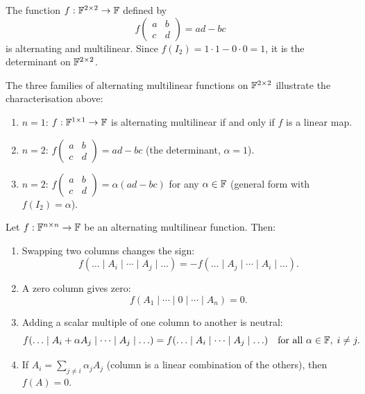 \begin{exbox}
\label{ex:det-2x2}
The function $f:\mathbb{F}^{2\times 2}\to\mathbb{F}$ defined by
\[
    f\!\begin{pmatrix}a&b\\c&d\end{pmatrix} = ad - bc
\]
is alternating and multilinear.  Since $f(I_2)=1\cdot 1-0\cdot 0=1$, it
is the determinant on $\mathbb{F}^{2\times 2}$.

\smallskip\noindent
The three families of alternating multilinear functions on
$\mathbb{F}^{2\times 2}$ illustrate the characterisation above:
\begin{enumerate}
    \item $n=1$: $f:\mathbb{F}^{1\times 1}\to\mathbb{F}$ is alternating multilinear if
          and only if $f$ is a linear map.
    \item $n=2$: $f\begin{pmatrix}a&b\\c&d\end{pmatrix}=ad-bc$
          (the determinant, $\alpha=1$).
    \item $n=2$: $f\begin{pmatrix}a&b\\c&d\end{pmatrix}=\alpha(ad-bc)$
          for any $\alpha\in\mathbb{F}$ (general form with $f(I_2)=\alpha$).
\end{enumerate}
\end{exbox}

\begin{propbox}
\label{prop:alt-mult-props}
Let $f:\mathbb{F}^{n\times n}\to\mathbb{F}$ be an alternating multilinear function.
Then:
\begin{enumerate}[label=\textbf{(\alph*)}]
    \item Swapping two columns changes the sign:
          \[
            f(\ldots\mid A_i\mid\cdots\mid A_j\mid\ldots)
            = -f(\ldots\mid A_j\mid\cdots\mid A_i\mid\ldots).
          \]
    \item A zero column gives zero:
          \[
            f(A_1\mid\cdots\mid 0\mid\cdots\mid A_n)=0.
          \]
    \item Adding a scalar multiple of one column to another is neutral:
          \[
            f(\ldots\mid A_i+\alpha A_j\mid\cdots\mid A_j\mid\ldots)
            = f(\ldots\mid A_i\mid\cdots\mid A_j\mid\ldots)
            \quad\text{for all }\alpha\in\mathbb{F},\; i\neq j.
          \]
    \item If $A_i=\sum_{j\neq i}\alpha_j A_j$ (column is a linear
          combination of the others), then $f(A)=0$.
\end{enumerate}
\end{propbox}

